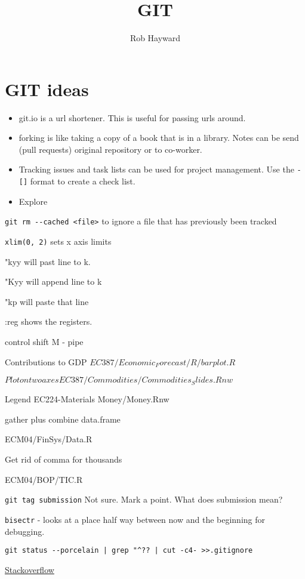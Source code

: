\documentclass[11pt]{article} %
\title{GIT}
\author{Rob Hayward}
\begin{document}
\maketitle
\section{GIT ideas}
\begin{itemize}
\item git.io is a url shortener.  This is useful for passing urls around. 
\item forking is like taking a copy of a book that is in a library. Notes can be send (pull requests) original repository or to co-worker.
\item Tracking issues and task lists can be used for project management. Use the \lstinline{-[]} format to create a check list. 
\item Explore
\end{itemize}

\lstinline{git rm --cached <file>}  to ignore a file that has previously been tracked

\lstinline{xlim(0, 2)}  sets x axis limits

"kyy will past line to k.  

"Kyy will append line to k

"kp will paste that line

:reg shows the registers. 

control shift M - pipe

Contributions to GDP
$EC387/Economic_Forecast/R/barplot.R$

$Plot on two axes EC387/Commodities/Commodities_Slides.Rnw$

Legend EC224-Materials Money/Money.Rnw

gather plus combine data.frame

ECM04/FinSys/Data.R

Get rid of comma for thousands

ECM04/BOP/TIC.R

\lstinline{git tag submission}  Not sure.  Mark a point. What does submission mean? 

\lstinline{bisectr} - looks at a place half way between now and the beginning for debugging.

\lstinline{git status --porcelain | grep "^?? | cut -c4- >>.gitignore}

\href{http://stackoverflow.com/questions/11542687/git-how-to-ignore-all-present-untracked-files}{Stackoverflow}
\end{document}
